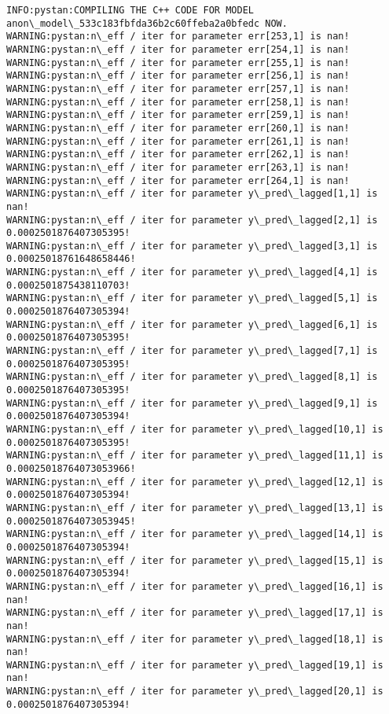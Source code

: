 \documentclass[11pt]{article}
\begin{document}
    \begin{Verbatim}[commandchars=\\\{\}]
INFO:pystan:COMPILING THE C++ CODE FOR MODEL anon\_model\_533c183fbfda36b2c60ffeba2a0bfedc NOW.
WARNING:pystan:n\_eff / iter for parameter err[253,1] is nan!
WARNING:pystan:n\_eff / iter for parameter err[254,1] is nan!
WARNING:pystan:n\_eff / iter for parameter err[255,1] is nan!
WARNING:pystan:n\_eff / iter for parameter err[256,1] is nan!
WARNING:pystan:n\_eff / iter for parameter err[257,1] is nan!
WARNING:pystan:n\_eff / iter for parameter err[258,1] is nan!
WARNING:pystan:n\_eff / iter for parameter err[259,1] is nan!
WARNING:pystan:n\_eff / iter for parameter err[260,1] is nan!
WARNING:pystan:n\_eff / iter for parameter err[261,1] is nan!
WARNING:pystan:n\_eff / iter for parameter err[262,1] is nan!
WARNING:pystan:n\_eff / iter for parameter err[263,1] is nan!
WARNING:pystan:n\_eff / iter for parameter err[264,1] is nan!
WARNING:pystan:n\_eff / iter for parameter y\_pred\_lagged[1,1] is nan!
WARNING:pystan:n\_eff / iter for parameter y\_pred\_lagged[2,1] is 0.0002501876407305395!
WARNING:pystan:n\_eff / iter for parameter y\_pred\_lagged[3,1] is 0.00025018761648658446!
WARNING:pystan:n\_eff / iter for parameter y\_pred\_lagged[4,1] is 0.0002501875438110703!
WARNING:pystan:n\_eff / iter for parameter y\_pred\_lagged[5,1] is 0.0002501876407305394!
WARNING:pystan:n\_eff / iter for parameter y\_pred\_lagged[6,1] is 0.0002501876407305395!
WARNING:pystan:n\_eff / iter for parameter y\_pred\_lagged[7,1] is 0.0002501876407305395!
WARNING:pystan:n\_eff / iter for parameter y\_pred\_lagged[8,1] is 0.0002501876407305395!
WARNING:pystan:n\_eff / iter for parameter y\_pred\_lagged[9,1] is 0.0002501876407305394!
WARNING:pystan:n\_eff / iter for parameter y\_pred\_lagged[10,1] is 0.0002501876407305395!
WARNING:pystan:n\_eff / iter for parameter y\_pred\_lagged[11,1] is 0.00025018764073053966!
WARNING:pystan:n\_eff / iter for parameter y\_pred\_lagged[12,1] is 0.0002501876407305394!
WARNING:pystan:n\_eff / iter for parameter y\_pred\_lagged[13,1] is 0.00025018764073053945!
WARNING:pystan:n\_eff / iter for parameter y\_pred\_lagged[14,1] is 0.0002501876407305394!
WARNING:pystan:n\_eff / iter for parameter y\_pred\_lagged[15,1] is 0.0002501876407305394!
WARNING:pystan:n\_eff / iter for parameter y\_pred\_lagged[16,1] is nan!
WARNING:pystan:n\_eff / iter for parameter y\_pred\_lagged[17,1] is nan!
WARNING:pystan:n\_eff / iter for parameter y\_pred\_lagged[18,1] is nan!
WARNING:pystan:n\_eff / iter for parameter y\_pred\_lagged[19,1] is nan!
WARNING:pystan:n\_eff / iter for parameter y\_pred\_lagged[20,1] is 0.0002501876407305394!

\end{Verbatim}
\end{document}
